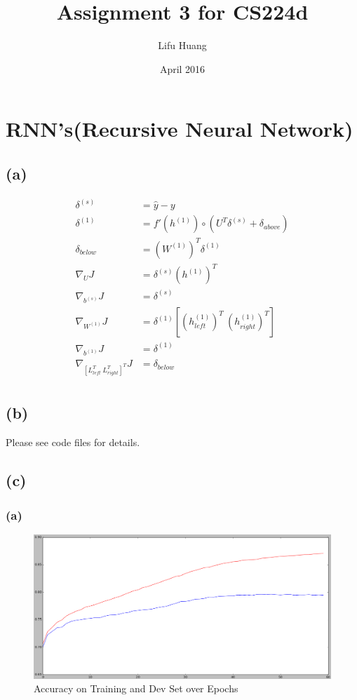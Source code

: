\documentclass {article}
\title{Assignment 3 for CS224d}
\author{Lifu Huang}
\date{April 2016}
\begin{document}
\maketitle
\section{RNN's(Recursive Neural Network)}
\subsection*{(a)}
\begin{align*}
\delta^{(s)} &= \hat{y} - y \\
\delta^{(1)} &= f'(h^{(1)}) \circ (U^T \delta^{(s)} + \delta_{above}) \\
\delta_{below} &= (W^{(1)})^T \delta^{(1)}
\\
\nabla_U J &= \delta^{(s)} (h^{(1)})^T \\
\nabla_{b^{(s)}} J &= \delta^{(s)} \\
\nabla_{W^{(1)}} J &= \delta^{(1)} \left[(h^{(1)}_{left})^T\  (h^{(1)}_{right})^T\right] \\
\nabla_{b^{(1)}} J &= \delta^{(1)} \\
\nabla_{\left[L_{left}^T\ L_{right}^T\right]^T} J &= \delta_{below} \\
\end{align*}
\subsection*{(b)}
Please see code files for details.
\newpage
\subsection*{(c)}
\subsubsection*{(a)}
\begin{figure}[H]
\centering
\includegraphics[width=0.7\linewidth]{ps3_1_c_a}
\caption{Accuracy on Training and Dev Set over Epochs}
\label{fig:ps3_1_c_a}
\end{figure}
\end{document}
